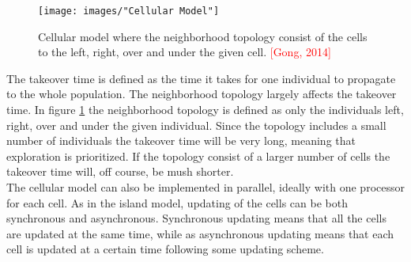 \begin{figure}[h!]
\begin{center}
\texttt{[image: images/"Cellular Model"]}
\caption{Cellular model where the neighborhood topology consist of the cells to the left, right, over and under the given cell. \textcolor{red}{[Gong, 2014]}}
\label{Cellular model}
\end{center}
\end{figure}


\noindent The takeover time is defined as the time it takes for one individual to propagate to the whole population. The neighborhood topology largely affects the takeover time. In figure \ref{Cellular model} the neighborhood topology is defined as only the individuals left, right, over and under the given individual. Since the topology includes a small number of individuals the takeover time will be very long, meaning that exploration is prioritized. If the topology consist of a larger number of cells the takeover time will, off course, be mush shorter.\\


\noindent The cellular model can also be implemented in parallel, ideally with one processor for each cell. As in the island model, updating of the cells can be both synchronous and asynchronous. Synchronous updating means that all the cells are updated at the same time, while as asynchronous updating means that each cell is updated at a certain time following some updating scheme. 


